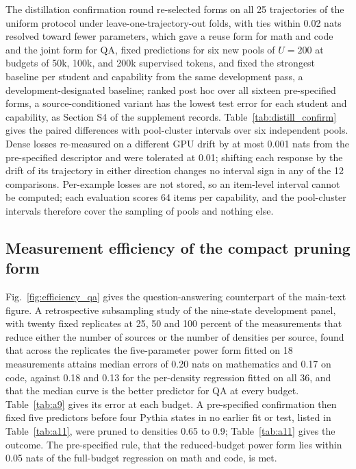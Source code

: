 The distillation confirmation round re-selected forms on all 25 trajectories of the uniform protocol under leave-one-trajectory-out folds, with ties within 0.02 nats resolved toward fewer parameters, which gave a reuse form for math and code and the joint form for QA, fixed predictions for six new pools
of $U{=}200$ at budgets of 50k, 100k, and 200k supervised tokens, and
fixed the strongest baseline per student and capability from the same development pass, a development-designated baseline; ranked post hoc over all sixteen pre-specified forms, a source-conditioned variant has the lowest test error for each student and capability, as Section S4 of the supplement records. Table~\ref{tab:distill_confirm} gives the paired differences with pool-cluster intervals over six independent pools. Dense losses
re-measured on a different GPU drift by at most 0.001 nats from the
pre-specified descriptor and were tolerated at 0.01; shifting each response
by the drift of its trajectory in either direction changes no interval sign in any of the 12 comparisons. Per-example losses are
not stored, so an item-level interval cannot be computed; each
evaluation scores 64 items per capability, and the pool-cluster intervals therefore cover the sampling of pools and nothing else.


\subsection{Measurement efficiency of the compact pruning form}
\label{sec:app_a11}

Fig.~\ref{fig:efficiency_qa} gives the question-answering counterpart of the main-text figure. A retrospective subsampling study of the nine-state development panel, with twenty fixed replicates at 25, 50 and 100 percent of the measurements that reduce either the number of sources or the number of densities per source, found that across the replicates the five-parameter power form fitted on 18
measurements attains median errors of 0.20 nats on mathematics and 0.17 on code, against 0.18 and
0.13 for the per-density regression fitted on all 36, and that the
median curve is the better predictor for QA at every budget. Table~\ref{tab:a9} gives its error at each budget. A pre-specified confirmation then fixed
five predictors before four Pythia states in no earlier fit or test, listed in Table~\ref{tab:a11}, were pruned to densities 0.65 to 0.9;
Table~\ref{tab:a11} gives the outcome. The pre-specified rule, that the reduced-budget power form lies within 0.05 nats of the full-budget regression on math and code, is met.


